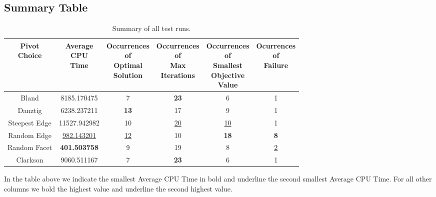 \documentclass{standalone}
\begin{document}
  \subsection{Summary Table}
  \begin{table}[H]
  \centering
  \begin{tabular}{@{}cccccc@{}}
  \toprule
  \makecell{Pivot\\Choice} & \makecell{Average\\CPU\\Time} & \makecell{Occurrences\\of\\ Optimal\\Solution} & \makecell{Occurrences\\of\\Max\\Iterations} & \makecell{Occurrences\\of\\Smallest\\Objective\\Value} & \makecell{Ocurrences\\of\\Failure} \\ \midrule
  Bland & 8185.170475 & 7 & \textbf{23} & 6 & 1 \\
  Danztig & 6238.237211 & \textbf{13} & 17 & 9 & 1 \\
  Steepest Edge & 11527.942982 & 10 & \underline{20} & \underline{10} & 1 \\
  Random Edge & \underline{982.143201} & \underline{12} & 10 & \textbf{18} & \textbf{8} \\
  Random Facet & \textbf{401.503758} & 9 & 19 & 8 & \underline{2} \\
  Clarkson & 9060.511167 & 7 & \textbf{23} & 6 & 1 \\ \bottomrule
  \end{tabular}
  \caption{Summary of all test runs.}
  \label{tab:summary}
  \end{table}
  In the table above we indicate the smallest Average CPU Time in bold and underline the second smallest Average CPU Time. For all other columns we bold the highest value and underline the second highest value.
\end{document}
